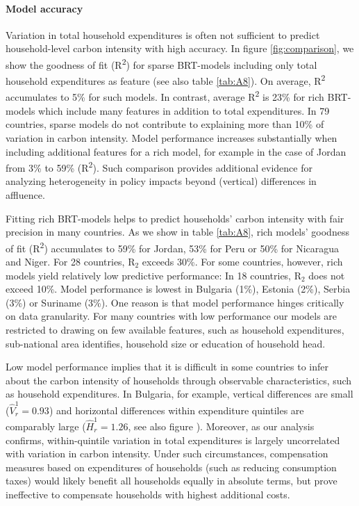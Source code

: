 \documentclass[12pt, a4paper]{article}
\begin{document}
\paragraph{Model accuracy} 
Variation in total household expenditures is often not sufficient to predict household-level carbon intensity with high accuracy. In figure \ref{fig:comparison}, we show the goodness of fit (R\textsuperscript{2}) for sparse BRT-models including only total household expenditures as feature (see also table \ref{tab:A8}). On average, R\textsuperscript{2} accumulates to 5\% for such models. In contrast, average R\textsuperscript{2} is 23\% for rich BRT-models which include many features in addition to total expenditures. In 79 countries, sparse models do not contribute to explaining more than 10\% of variation in carbon intensity. Model performance increases substantially when including additional features for a rich model, for example in the case of Jordan from 3\% to 59\% (R\textsuperscript{2}). Such comparison provides additional evidence for analyzing heterogeneity in policy impacts beyond (vertical) differences in affluence.

Fitting rich BRT-models helps to predict households' carbon intensity with fair precision in many countries. As we show in table \ref{tab:A8}, rich models' goodness of fit (R\textsuperscript{2}) accumulates to 59\% for Jordan, 53\% for Peru or 50\% for Nicaragua and Niger. For 28 countries, R$_{2}$ exceeds 30\%. For some countries, however, rich models yield relatively low predictive performance: In 18 countries, R$_{2}$ does not exceed 10\%. Model performance is lowest in Bulgaria (1\%), Estonia (2\%), Serbia (3\%) or Suriname (3\%). One reason is that model performance hinges critically on data granularity. For many countries with low performance our models are restricted to drawing on few available features, such as household expenditures, sub-national area identifies, household size or education of household head.

Low model performance implies that it is difficult in some countries to infer about the carbon intensity of households through observable characteristics, such as household expenditures. In Bulgaria, for example, vertical differences are small ($\widehat{V}_{r}^{1}=0.93$) and horizontal differences within expenditure quintiles are comparably large ($\widehat{H}_{r}^{1}=1.26$, see also figure ). Moreover, as our analysis confirms, within-quintile variation in total expenditures is largely uncorrelated with variation in carbon intensity. Under such circumstances, compensation measures based on expenditures of households (such as reducing consumption taxes) would likely benefit all households equally in absolute terms, but prove ineffective to compensate households with highest additional costs. 
\end{document}
